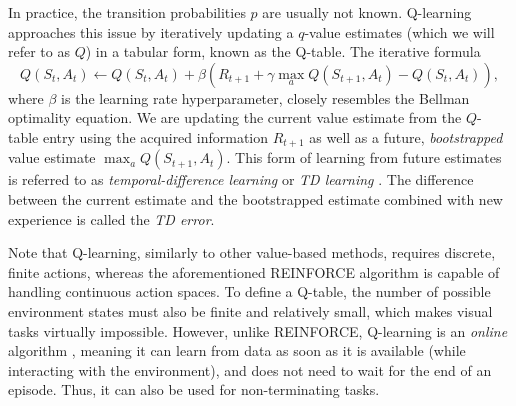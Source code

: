 In practice, the transition probabilities $p$ are usually not known. Q-learning \cite{q-learning} approaches this issue by iteratively updating a $q$-value estimates (which we will refer to as $Q$) in a tabular form, known as the Q-table. The iterative formula
\begin{equation*}
    Q\left(S_t, A_t\right) \gets Q\left(S_t, A_t\right) + \beta\left(R_{t+1} + \gamma \max_a Q\left(S_{t+1}, A_t\right) - Q\left(S_t, A_t\right)\right),
\end{equation*}
where $\beta$ is the learning rate hyperparameter, closely resembles the Bellman optimality equation. We are updating the current value estimate from the $Q$-table entry using the acquired information $R_{t+1}$ as well as a future, \textit{bootstrapped} value estimate $\max_a Q\left(S_{t+1}, A_t\right)$. This form of learning from future estimates is referred to as \textit{temporal-difference learning} or \textit{TD learning} \cite{td-learning}. The difference between the current estimate and the bootstrapped estimate combined with new experience is called the \textit{TD error}.

Note that Q-learning, similarly to other value-based methods, requires discrete, finite actions, whereas the aforementioned REINFORCE algorithm is capable of handling continuous action spaces. To define a Q-table, the number of possible environment states must also be finite and relatively small, which makes visual tasks virtually impossible. However, unlike REINFORCE, Q-learning is an \mbox{\textit{online}} algorithm \cite{bible}, meaning it can learn from data as soon as it is available (while interacting with the environment), and does not need to wait for the end of an episode. Thus, it can also be used for non-terminating tasks.